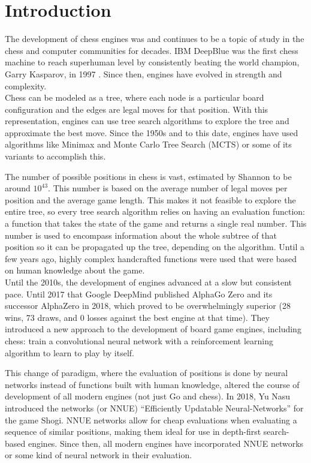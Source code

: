 \section{Introduction}

The development of chess engines was and continues to be a topic of study in the chess and computer communities for decades. IBM DeepBlue \cite{deepblue:2002} was the first chess machine to reach superhuman level by consistently beating the world champion, Garry Kasparov, in 1997 \cite{washingtonpost:1997}. Since then, engines have evolved in strength and complexity. \\

Chess can be modeled as a tree, where each node is a particular board configuration and the edges are legal moves for that position. With this representation, engines can use tree search algorithms to explore the tree and approximate the best move. Since the 1950s and to this date, engines have used algorithms like Minimax \cite{minimax-survey:1995} and Monte Carlo Tree Search \cite{mcts-survey:2012} (MCTS) or some of its variants \cite{tree-search-methods:2014,mcts-modifications:2022} to accomplish this.

The number of possible positions in chess is vast, estimated by Shannon \cite{shannon:1950} to be around $10^{43}$. This number is based on the average number of legal moves per position and the average game length. This makes it not feasible to explore the entire tree, so every tree search algorithm relies on having an evaluation function: a function that takes the state of the game and returns a single real number. This number is used to encompass information about the whole subtree of that position so it can be propagated up the tree, depending on the algorithm. Until a few years ago, highly complex handcrafted functions were used that were based on human knowledge about the game. \\

Until the 2010s, the development of engines advanced at a slow but consistent pace. Until 2017 that Google DeepMind published AlphaGo Zero \cite{alphagozero:2017} and its successor AlphaZero \cite{alphazero:2017,alphazero:2018} in 2018, which proved to be overwhelmingly superior (28 wins, 73 draws, and 0 losses against the best engine at that time). They introduced a new approach to the development of board game engines, including chess: train a convolutional neural network with a reinforcement learning algorithm to learn to play by itself.

This change of paradigm, where the evaluation of positions is done by neural networks instead of functions built with human knowledge, altered the course of development of all modern engines (not just Go and chess). In 2018, Yu Nasu introduced the networks  (or NNUE) ``Efficiently Updatable Neural-Networks'' \cite{nnue:2018} for the game Shogi. NNUE networks allow for cheap evaluations when evaluating a sequence of similar positions, making them ideal for use in depth-first search-based engines. Since then, all modern engines have incorporated NNUE networks or some kind of neural network in their evaluation.

